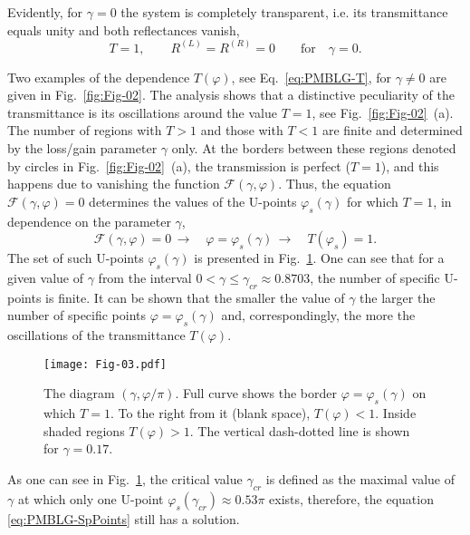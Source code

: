 \documentclass[aps,pra,reprint,showpacs,bibnotes,preprintnumbers,twoside,eqsecnum]{revtex4-1}
\begin{document}
Evidently, for $\gamma=0$ the system is completely transparent, i.e. its transmittance equals unity and both reflectances vanish,
%
\begin{equation}\label{eq:PMBLG-TR-gamma0}
T=1,\qquad R^{(L)}=R^{(R)}=0\qquad\mathrm{for}\quad\gamma=0.
\end{equation}

Two examples of the dependence $T(\varphi)$, see Eq.~\eqref{eq:PMBLG-T}, for $\gamma\neq0$ are given in Fig.~\ref{fig:Fig-02}. The analysis shows that a distinctive peculiarity of the transmittance is its oscillations around the value $T=1$, see Fig.~\ref{fig:Fig-02}~(a). The number of regions with $T>1$ and those with $T<1$ are finite and determined by the loss/gain parameter $\gamma$ only. At the borders between these regions denoted by circles in Fig.~\ref{fig:Fig-02}~(a), the transmission is perfect ($T=1$), and this happens due to vanishing the function $\mathcal{F}(\gamma,\varphi)$. Thus, the equation $\mathcal{F}(\gamma,\varphi)=0$ determines the values of the U-points $\varphi_s(\gamma)$ for which $T=1$, in dependence on the parameter $\gamma$,
%
\begin{equation}\label{eq:PMBLG-SpPoints}
\mathcal{F}(\gamma,\varphi)=0\,\to\quad\varphi=\varphi_s(\gamma)\,\to\quad T(\varphi_s)=1.
\end{equation}
The set of such U-points $\varphi_s(\gamma)$ is presented in Fig.~\ref{fig:Fig-03}. One can see that for a given value of $\gamma$ from the interval $0<\gamma\leqslant\gamma_{cr}\approx0.8703$, the number of specific U-points is finite. It can be shown that the smaller the value of $\gamma$ the larger the number of specific points $\varphi=\varphi_s(\gamma)$ and, correspondingly, the more the oscillations of the transmittance $T(\varphi)$.

\begin{figure}[t]
\centering
\texttt{[image: Fig-03.pdf]}
\caption{The diagram $(\gamma,\varphi/\pi)$. Full curve shows the border $\varphi=\varphi_s(\gamma)$ on which $T=1$. To the right from it (blank space), $T(\varphi)<1$. Inside shaded regions $T(\varphi)>1$. The vertical dash-dotted line is shown for $\gamma=0.17$.}\label{fig:Fig-03}
\end{figure}
As one can see in Fig.~\ref{fig:Fig-03}, the critical value $\gamma_{cr}$ is defined as the maximal value of $\gamma$ at which only one U-point $\varphi_s(\gamma_{cr})\approx0.53\pi$ exists, therefore, the equation \eqref{eq:PMBLG-SpPoints} still has a solution.
\end{document}
